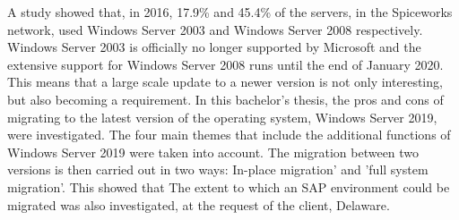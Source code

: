 A study \autocite{Tsai2016} showed that, in 2016, 17.9\% and 45.4\% of the servers, in the Spiceworks network, used Windows Server 2003 and Windows Server 2008 respectively. Windows Server 2003 is officially no longer supported by Microsoft and the extensive support for Windows Server 2008 runs until the end of January 2020. This means that a large scale update to a newer version is not only interesting, but also becoming a requirement. In this bachelor's thesis, the pros and cons of migrating to the latest version of the operating system, Windows Server 2019, were investigated. The four main themes that include the additional functions of Windows Server 2019 were taken into account. The migration between  two versions is then carried out in two ways: In-place migration' and 'full system migration'. 
This showed that %
The extent to which an SAP environment could be migrated was also investigated, at the request of the client, Delaware. %

